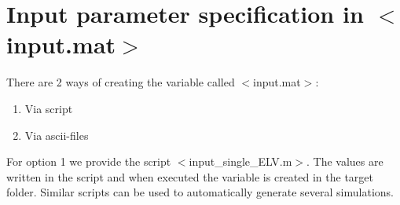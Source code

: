 \documentclass[a4paper, 11pt]{article}
\newcommand{\pathfile}[1]{$<$#1$>$}
\begin{document}
%
%
%
%
%

%
\clearpage
\section{Input parameter specification in \pathfile{input.mat}} 
%
\label{sec:input}
%
%
There are 2 ways of creating the variable called \pathfile{input.mat}: 
\begin{enumerate}
\item Via script
\item Via ascii-files 
\end{enumerate}

For option 1 we provide the script \pathfile{input\_single\_ELV.m}. The values are written in the script and when executed the variable is created in the target folder. Similar scripts can be used to automatically generate several simulations.
\end{document}
